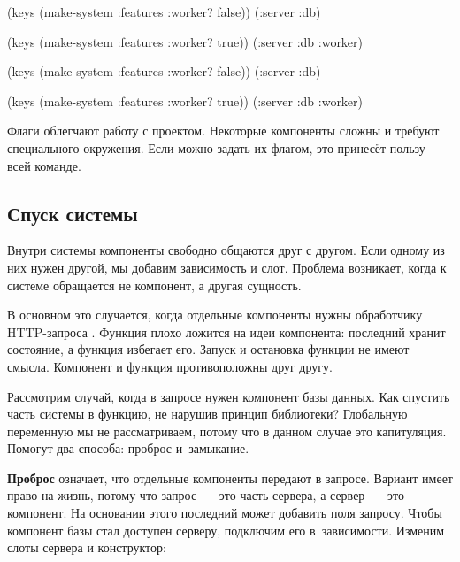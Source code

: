\ifx\DEVICETYPE\MOBILE

\begin{english}
  \begin{clojure}
(keys (make-system
        {:features {:worker? false}}))
(:server :db)

(keys (make-system
        {:features {:worker? true}}))
(:server :db :worker)
  \end{clojure}
\end{english}

\else

\begin{english}
  \begin{clojure}
(keys (make-system {:features {:worker? false}}))
(:server :db)

(keys (make-system {:features {:worker? true}}))
(:server :db :worker)
  \end{clojure}
\end{english}

\fi

Флаги облегчают работу с проектом. Некоторые компоненты сложны и требуют
специального окружения. Если можно задать их флагом, это принесёт пользу
всей команде.

\subsection{Спуск системы}


Внутри системы компоненты свободно общаются друг с другом. Если одному из них
нужен другой, мы добавим зависимость и слот. Проблема возникает, когда к системе
обращается не компонент, а другая сущность.

В основном это случается, когда отдельные компоненты нужны обработчику
HTTP-запроса . Функция плохо ложится на идеи компонента:
последний хранит состояние, а функция избегает его. Запуск и остановка функции
не имеют смысла. Компонент и функция противоположны друг другу.

Рассмотрим случай, когда в запросе нужен компонент базы данных. Как спустить
часть системы в функцию, не нарушив принцип библиотеки? Глобальную переменную мы
не рассматриваем, потому что в данном случае это капитуляция. Помогут два
способа: проброс и~замыкание.


\textbf{Проброс} означает, что отдельные компоненты передают в запросе. Вариант
имеет право на жизнь, потому что запрос~--- это часть сервера, а сервер~--- это
компонент. На основании этого последний может добавить поля запросу. Чтобы компонент
базы стал доступен серверу, подключим его в~зависимости. Изменим слоты сервера и
конструктор:

